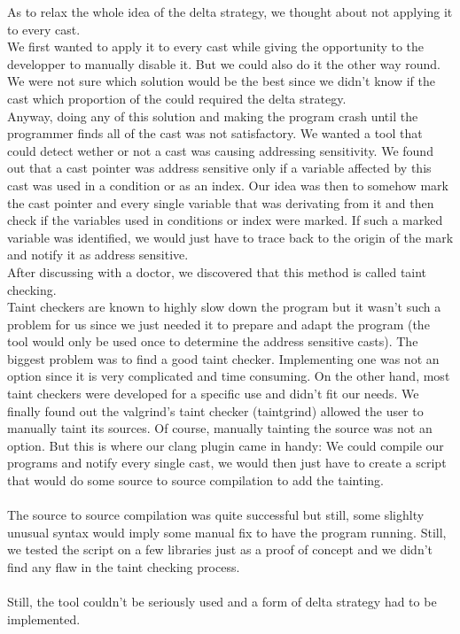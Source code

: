 \documentclass[english]{enstaPRE}
\begin{document}
As to relax the whole idea of the delta strategy, we thought about not applying it to every cast. \\
We first wanted to apply it to every cast while giving the opportunity to the developper to manually disable it. But we could also do
it the other way round. We were not sure which solution would be the best since we didn't know if the cast which proportion of the 
could required the delta strategy. \\ Anyway, doing any of this solution and making the program crash until the programmer finds all
of the cast was not satisfactory.
We wanted a tool that could detect wether or not a cast was causing addressing sensitivity. We found out that a cast pointer was
address sensitive only if a variable affected by this cast was used in a condition or as an index.
Our idea was then to somehow mark the cast pointer and every single variable that was derivating from it and then check if the variables
used in conditions or index were marked. If such a marked variable was identified, we would just have to trace back to the origin of
the mark and notify it as address sensitive. \\ 
After discussing with a doctor, we discovered that this method is called taint checking. \\
Taint checkers are known to highly slow down the program but it wasn't such a problem for us since we just needed it to prepare and 
adapt the program (the tool would only be used once to determine the address sensitive casts). The biggest problem was to find a good 
taint checker. Implementing one was not an option since it is very complicated and time consuming. On the other hand, most taint 
checkers were developed for a specific use and didn't fit our needs. We finally found out the valgrind's taint checker (taintgrind)
allowed the user to manually taint its sources. Of course, manually tainting the source was not an option. But this is where our
clang plugin came in handy: We could compile our programs and notify every single cast, we would then just have to create a script 
that would do some source to source compilation to add the tainting.
\\ \\
The source to source compilation was quite successful but still, some slighlty unusual syntax would imply some manual fix to have the
program running. Still, we tested the script on a few libraries just as a proof of concept and we didn't find any flaw in the taint
checking process. \\ \\
Still, the tool couldn't be seriously used and a form of delta strategy had to be implemented. \\
\end{document}

